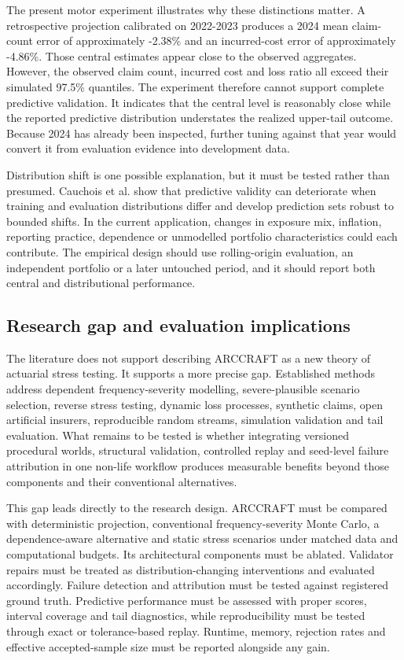The present motor experiment illustrates why these distinctions matter. A retrospective projection calibrated on 2022-2023 produces a 2024 mean claim-count error of approximately -2.38\% and an incurred-cost error of approximately -4.86\%. Those central estimates appear close to the observed aggregates. However, the observed claim count, incurred cost and loss ratio all exceed their simulated 97.5\% quantiles. The experiment therefore cannot support complete predictive validation. It indicates that the central level is reasonably close while the reported predictive distribution understates the realized upper-tail outcome. Because 2024 has already been inspected, further tuning against that year would convert it from evaluation evidence into development data.

Distribution shift is one possible explanation, but it must be tested rather than presumed. Cauchois et al. \cite{Cauchois2024} show that predictive validity can deteriorate when training and evaluation distributions differ and develop prediction sets robust to bounded shifts. In the current application, changes in exposure mix, inflation, reporting practice, dependence or unmodelled portfolio characteristics could each contribute. The empirical design should use rolling-origin evaluation, an independent portfolio or a later untouched period, and it should report both central and distributional performance.

\subsection{Research gap and evaluation implications}\label{sec:research-gap-and-evaluation-implications}

The literature does not support describing ARCCRAFT as a new theory of actuarial stress testing. It supports a more precise gap. Established methods address dependent frequency-severity modelling, severe-plausible scenario selection, reverse stress testing, dynamic loss processes, synthetic claims, open artificial insurers, reproducible random streams, simulation validation and tail evaluation. What remains to be tested is whether integrating versioned procedural worlds, structural validation, controlled replay and seed-level failure attribution in one non-life workflow produces measurable benefits beyond those components and their conventional alternatives.

This gap leads directly to the research design. ARCCRAFT must be compared with deterministic projection, conventional frequency-severity Monte Carlo, a dependence-aware alternative and static stress scenarios under matched data and computational budgets. Its architectural components must be ablated. Validator repairs must be treated as distribution-changing interventions and evaluated accordingly. Failure detection and attribution must be tested against registered ground truth. Predictive performance must be assessed with proper scores, interval coverage and tail diagnostics, while reproducibility must be tested through exact or tolerance-based replay. Runtime, memory, rejection rates and effective accepted-sample size must be reported alongside any gain.

